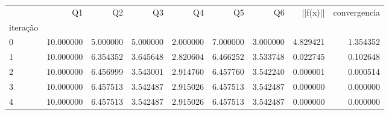 \begin{tabular}{lrrrrrrrr}
\toprule
 & Q1 & Q2 & Q3 & Q4 & Q5 & Q6 & ||f(x)|| & convergencia \\
iteração &  &  &  &  &  &  &  &  \\
\midrule
0 & 10.000000 & 5.000000 & 5.000000 & 2.000000 & 7.000000 & 3.000000 & 4.829421 & 1.354352 \\
1 & 10.000000 & 6.354352 & 3.645648 & 2.820604 & 6.466252 & 3.533748 & 0.022745 & 0.102648 \\
2 & 10.000000 & 6.456999 & 3.543001 & 2.914760 & 6.457760 & 3.542240 & 0.000001 & 0.000514 \\
3 & 10.000000 & 6.457513 & 3.542487 & 2.915026 & 6.457513 & 3.542487 & 0.000000 & 0.000000 \\
4 & 10.000000 & 6.457513 & 3.542487 & 2.915026 & 6.457513 & 3.542487 & 0.000000 & 0.000000 \\
\bottomrule
\end{tabular}
